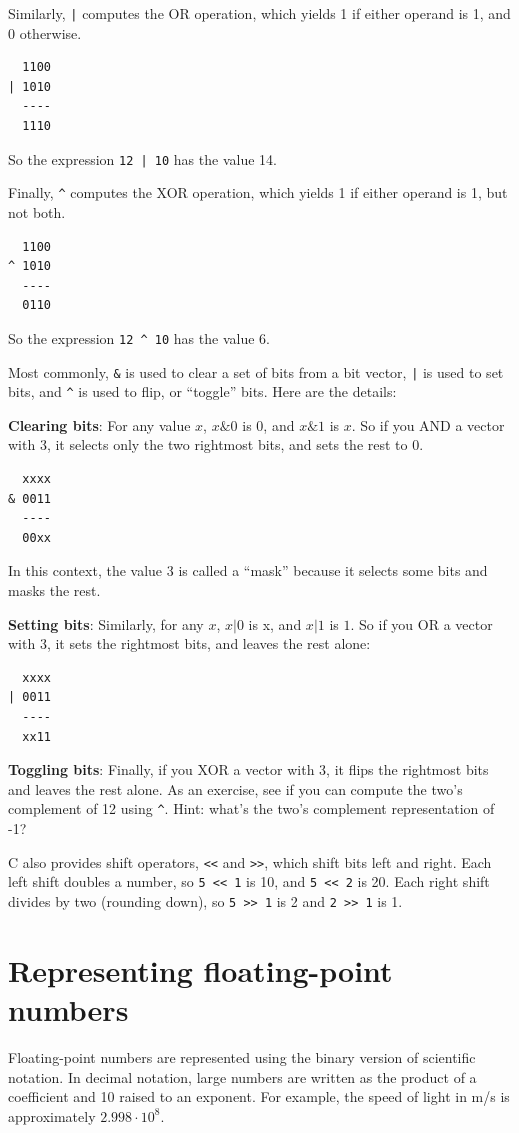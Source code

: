 \documentclass[12pt]{book}
\begin{document}
Similarly, \verb"|" computes the OR operation, which yields
1 if either operand is 1, and 0 otherwise.
%
\begin{verbatim}
  1100
| 1010
  ----
  1110
\end{verbatim}
%
So the expression \verb"12 | 10" has the value 14.

Finally, \verb"^" computes the XOR operation, which yields
1 if either operand is 1, but not both.
%
\begin{verbatim}
  1100
^ 1010
  ----
  0110
\end{verbatim}
%
So the expression \verb"12 ^ 10" has the value 6.

Most commonly, \verb"&" is used to clear a set of bits from
a bit vector, \verb"|" is used to set bits, and \verb"^"
is used to flip, or ``toggle'' bits.  Here are the details:

{\bf Clearing bits}: For any value $x$, $x \& 0$ is 0, and $x \& 1$ is $x$.
So if you AND a vector with 3, it 
selects only the two rightmost bits, and sets the rest to 0.
%
\begin{verbatim}
  xxxx
& 0011
  ----
  00xx
\end{verbatim}
%
In this context, the value 3 is called a ``mask'' because it
selects some bits and masks the rest.

{\bf Setting bits}: Similarly, for any $x$, $x | 0$ is x, and $x | 1$ is $1$.
So if you OR a vector with 3, it sets the rightmost
bits, and leaves the rest alone:
%
\begin{verbatim}
  xxxx
| 0011
  ----
  xx11
\end{verbatim}
%
{\bf Toggling bits}: Finally, if you XOR a vector with 3, it flips the
rightmost bits and leaves the rest alone.  As an exercise, see if you
can compute the two's complement of 12 using \verb"^".  Hint: what's
the two's complement representation of -1?


C also provides shift operators, {\tt <<} and {\tt >>}, which shift
bits left and right.  Each left shift doubles a number, so
{\tt 5 << 1} is 10, and {\tt 5 << 2} is 20.  Each right shift
divides by two (rounding down), so {\tt 5 >> 1} is 2 and
{\tt 2 >> 1} is 1.


\section{Representing floating-point numbers}

Floating-point numbers are represented using the binary
version of scientific notation.  In decimal notation, large
numbers are written as the product of a coefficient and 10 raised
to an exponent.  For example, the speed of light in m/s is
approximately $2.998 \cdot 10^8$.
\end{document}
